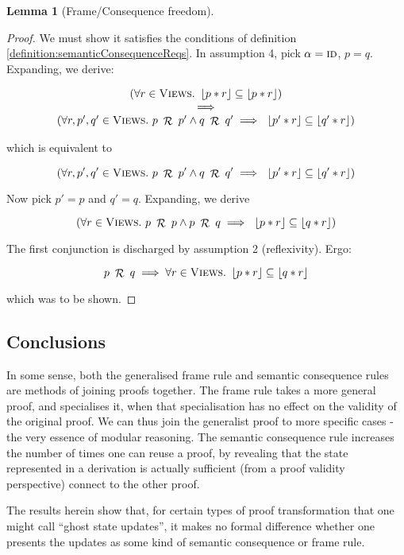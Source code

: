 \documentclass{article}
\theoremstyle{definition}
\theoremstyle{theorem}
\newtheorem{lemma}{Lemma}
\newcommand{\Views}{\textsc{Views}}
\newcommand{\idAction}{\textsc{id}}
\newcommand{\action}{\alpha}
\newcommand{\curly}[1]{{ \cal #1 }}
\newcommand{\genRel}{~\mathop{\curly{R}}~}
\newcommand{\reify}[1]{\left\lfloor{#1}\right\rfloor}
\begin{document}
\begin{lemma}[Frame/Consequence freedom]
\begin{proof}
    We must show it satisfies the conditions of definition \ref{definition:semanticConsequenceReqs}. In assumption 4, pick $\action = \idAction$, $p = q$. Expanding, we derive:

    \begin{displaymath}
      \begin{array}{c}
        (\forall r \in \Views.~\reify{p * r} \subseteq \reify{p * r})
        \\ \implies \\
        (\forall r, p', q' \in \Views.~p \genRel p' \land q \genRel q' \implies ~\reify{p' * r} \subseteq \reify{q' * r})
      \end{array}
    \end{displaymath}

    which is equivalent to 

    \begin{displaymath}
      (\forall r, p', q' \in \Views.~p \genRel p' \land q \genRel q' \implies ~\reify{p' * r} \subseteq \reify{q' * r})
    \end{displaymath}

    Now pick $p' = p$ and $q' = q$. Expanding, we derive

    \begin{displaymath}
      (\forall r \in \Views.~p \genRel p \land p \genRel q \implies ~\reify{p * r} \subseteq \reify{q * r})
    \end{displaymath}

    The first conjunction is discharged by assumption 2 (reflexivity). Ergo:

    \begin{displaymath}
      p \genRel q \implies \forall r \in \Views.~\reify{p * r} \subseteq \reify{q * r}
    \end{displaymath}

    which was to be shown.
  \end{proof}
\end{lemma}

\subsection{Conclusions}

  In some sense, both the generalised frame rule and semantic consequence rules are methods of joining proofs together. The frame rule takes a more general proof, and specialises it, when that specialisation has no effect on the validity of the original proof. We can thus join the generalist proof to more specific cases - the very essence of modular reasoning. The semantic consequence rule increases the number of times one can reuse a proof, by revealing that the state represented in a derivation is actually sufficient (from a proof validity perspective) connect to the other proof.

  The results herein show that, for certain types of proof transformation that one might call ``ghost state updates'', it makes no formal difference whether one presents the updates as some kind of semantic consequence or frame rule.
\end{document}
